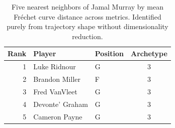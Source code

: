 \begin{table}[htbp]
  \centering\small
  \begin{tabular}{rllc}
    \toprule
    Rank & Player & Position & Archetype \\
    \midrule
    1 & Luke Ridnour & G & 3 \\
    2 & Brandon Miller & F & 3 \\
    3 & Fred VanVleet & G & 3 \\
    4 & Devonte' Graham & G & 3 \\
    5 & Cameron Payne & G & 3 \\
    \bottomrule
  \end{tabular}
  \caption{Five nearest neighbors of Jamal Murray by mean Fr\'{e}chet curve distance across metrics. Identified purely from trajectory shape without dimensionality reduction.}
  \label{tab:Jamal_Murray_frechet_curve_neighbors}
\end{table}

